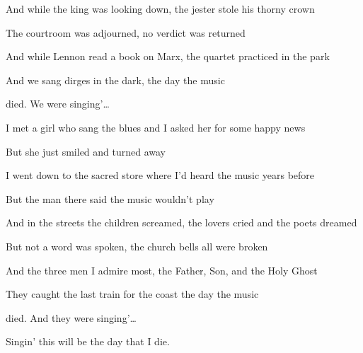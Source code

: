 \begin{song}
\bigskip

And while the king was looking down, the jester stole his thorny crown \par
The courtroom was adjourned, no verdict was returned \par
And while Lennon read a book on Marx, the quartet practiced in the park \par
And we sang dirges in the dark, the day the music \par
{}died.   We were singing'… \par

\bigskip

\Chorus \par

\bigskip

 \par
I met a girl who sang the blues and I asked her for some happy news \par
But she just smiled and turned away \par
I went down to the sacred store where I'd heard the music years before \par
But the man there said the music wouldn't play \par

\bigskip

And in the streets the children screamed, the lovers cried and the poets dreamed \par
But not a word was spoken, the church bells all were broken \par
And the three men I admire most, the Father, Son, and the Holy Ghost \par
They caught the last train for the coast the day the music \par
{}died. And they were singing'… \par

\bigskip

\Chorus \par
{} \par
Singin' this will be the day that I die. \par

\end{song}